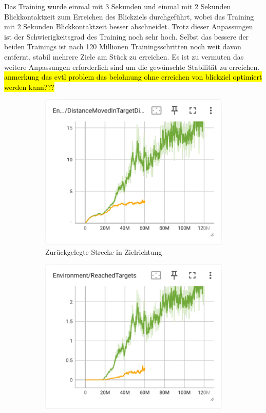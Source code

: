 Das Training wurde einmal mit 3 Sekunden und einmal mit 2 Sekunden Blickkontaktzeit zum Erreichen des Blickziels durchgeführt, wobei das Training mit 2 Sekunden Blickkontaktzeit besser abschneidet. Trotz dieser Anpassungen ist der Schwierigkeitsgrad des Training noch sehr hoch. Selbst das bessere der beiden Trainings ist nach 120 Millionen Trainingsschritten noch weit davon entfernt, stabil mehrere Ziele am Stück zu erreichen. Es ist zu vermuten das weitere Anpassungen erforderlich sind um die gewünschte Stabilität zu erreichen.
\hl{anmerkung das evtl problem das belohnung ohne erreichen von blickziel optimiert werden kann???}

\begin{figure}[H]
  \centering  
    \begin{subfigure}{.49\textwidth}
      \centering  
      \includegraphics[width=\textwidth]{img/117_119_move_target_dir}
      \caption{Zurückgelegte Strecke in Zielrichtung}
      \label{fig:117_119_move_target_dir}
    \end{subfigure}
    \begin{subfigure}{.49\textwidth}
      \centering  
      \includegraphics[width=\textwidth]{img/117_119_reach_target}

\end{subfigure}
\end{figure}
